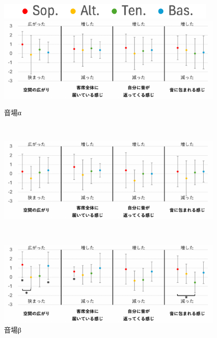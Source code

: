 \documentclass[11pt,a4j]{jreport}
\begin{document}
\begin{figure}[H]
  \centering
  
  \begin{minipage}{1\linewidth}
    \centering
    \includegraphics[scale=.55]{images/subjectiveExp/statisticAnalysis/part_legend.pdf}
  \end{minipage}
  \vspace{.5\baselineskip}

  \begin{minipage}{1\linewidth}
    \centering
    \includegraphics[scale=.55]{images/subjectiveExp/statisticAnalysis/part_space_a.pdf}
    \caption*{音場α}
    \label{fig:空間の印象α}
  \end{minipage}
  \\
  \vspace{1\baselineskip}
  \begin{minipage}{1\linewidth}
    \centering
    \includegraphics[scale=.55]{images/subjectiveExp/statisticAnalysis/part_space_b.pdf}
    \caption*{音場β}
    \label{fig:空間の印象β}
  \end{minipage}
  \\
  \vspace{1\baselineskip}
  \begin{minipage}{1\linewidth}
    \centering
    \includegraphics[scale=.55]{images/subjectiveExp/statisticAnalysis/part_space_c.pdf}

\end{minipage}
\end{figure}
\end{document}
